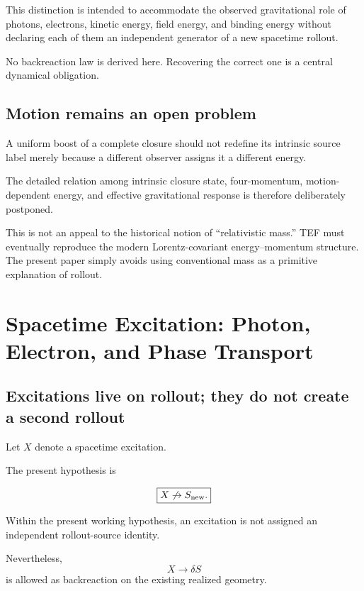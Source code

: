 \documentclass[10pt]{article}
\begin{document}
This distinction is intended to accommodate the observed gravitational role of photons, electrons, kinetic energy, field energy, and binding energy without declaring each of them an independent generator of a new spacetime rollout.

No backreaction law is derived here. Recovering the correct one is a central dynamical obligation.

\subsection{Motion remains an open problem}\label{motion-remains-an-open-problem}

A uniform boost of a complete closure should not redefine its intrinsic source label merely because a different observer assigns it a different energy.

The detailed relation among intrinsic closure state, four-momentum, motion-dependent energy, and effective gravitational response is therefore deliberately postponed.

This is not an appeal to the historical notion of ``relativistic mass.'' TEF must eventually reproduce the modern Lorentz-covariant energy--momentum structure. The present paper simply avoids using conventional mass as a primitive explanation of rollout.

\section{Spacetime Excitation: Photon, Electron, and Phase Transport}\label{spacetime-excitation-photon-electron-and-phase-transport}

\subsection{Excitations live on rollout; they do not create a second rollout}\label{excitations-live-on-rollout-they-do-not-create-a-second-rollout}

Let \(X\) denote a spacetime excitation.

The present hypothesis is

\[
\boxed{
X\not\rightarrow S_{\rm new}.
}
\]

Within the present working hypothesis, an excitation is not assigned an independent rollout-source identity.

Nevertheless, \[
X\rightarrow\delta S
\] is allowed as backreaction on the existing realized geometry.
\end{document}
